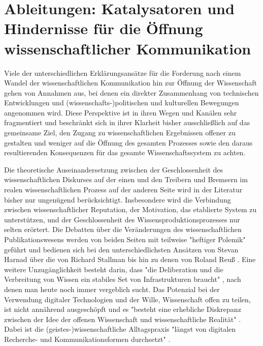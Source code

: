 \section{Ableitungen: Katalysatoren und Hindernisse für die Öffnung wissenschaftlicher Kommunikation}

Viele der unterschiedlichen Erklärungsansätze für die Forderung nach einem Wandel der wissenschaftlichen Kommunikation hin zur Öffnung der Wissenschaft gehen von Annahmen aus, bei denen ein direkter Zusammenhang von technischen Entwicklungen und (wissenschafts-)politischen und kulturellen Bewegungen angenommen wird. Diese Perspektive ist in ihren Wegen und Kanälen sehr fragmentiert und beschränkt sich in ihrer Klarheit bisher ausschließlich auf das gemeinsame Ziel, den Zugang zu wissenschaftlichen Ergebnissen offener zu gestalten und weniger auf die Öffnung des gesamten Prozesses sowie den daraus resultierenden Konsequenzen für das gesamte Wissenschaftssystem zu achten.

Die theoretische Auseinandersetzung zwischen der Geschlossenheit des wissenschaftlichen Diskurses auf der einen und den Treibern und Bremsern im realen wissenschaftlichen Prozess auf der anderen Seite wird in der Literatur bisher nur ungenügend berücksichtigt. Insbesondere wird die Verbindung zwischen wissenschaftlicher Reputation, der Motivation, das etablierte System zu unterstützen, und der Geschlossenheit des Wissensproduktionsprozesses nur selten erörtert. Die Debatten über die Veränderungen des wissenschaftlichen Publikationswesens werden von beiden Seiten mit teilweise "heftiger Polemik" \cite[:12]{Naeder_2010} geführt und bedienen sich bei den unterschiedlichsten Ansätzen von Stevan Harnad \cite{Harnad_1995} über die von Richard Stallman \cite{Stallman_2002} bis hin zu denen von Roland Reuß \cite{Reuss_2009}. Eine weitere Unzugänglichkeit besteht darin, dass "die Deliberation und die Verbreitung von Wissen ein stabiles Set von Infrastrukturen braucht" \cite{Kelty_2004}, nach denen man heute noch immer vergeblich sucht. Das Potenzial bei der Verwendung digitaler Technologien und der Wille, Wissenschaft offen zu teilen, ist nicht annährend ausgeschöpft und es "besteht eine erhebliche Diskrepanz zwischen der Idee der offenen Wissenschaft und wissenschaftliche Realität" \cite{Scheliga_2014}. Dabei ist die (geistes-)wissenschaftliche Alltagspraxis "längst von digitalen Recherche- und Kommunikationsformen durchsetzt" \cite{Hagner_2015}.

